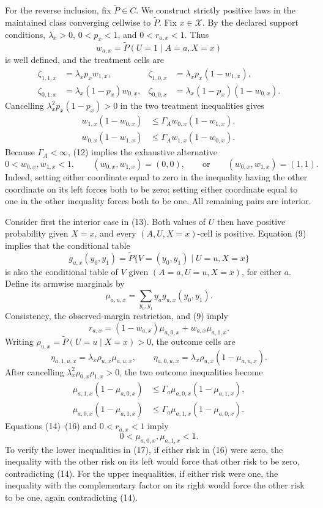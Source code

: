 For the reverse inclusion, fix \(\widetilde P\in C\).  We construct strictly positive laws in the maintained class converging cellwise to \(\widetilde P\).  Fix \(x\in\mathcal X\).  By the declared support conditions, \(\lambda_x>0\), \(0<p_x<1\), and \(0<r_{a,x}<1\).  Thus
\[
w_{a,x}=\widetilde P(U=1\mid A=a,X=x)
\]
is well defined, and the treatment cells are
\[
\begin{aligned}
\zeta_{1,1,x}&=\lambda_xp_xw_{1,x},
&\zeta_{1,0,x}&=\lambda_xp_x(1-w_{1,x}),\\
\zeta_{0,1,x}&=\lambda_x(1-p_x)w_{0,x},
&\zeta_{0,0,x}&=\lambda_x(1-p_x)(1-w_{0,x}).
\end{aligned}                                             \tag{11}
\]
Cancelling \(\lambda_x^2p_x(1-p_x)>0\) in the two treatment inequalities gives
\[
\begin{aligned}
w_{1,x}(1-w_{0,x})
&\leq\Gamma_Aw_{0,x}(1-w_{1,x}),\\
w_{0,x}(1-w_{1,x})
&\leq\Gamma_Aw_{1,x}(1-w_{0,x}).
\end{aligned}                                             \tag{12}
\]
Because \(\Gamma_A<\infty\), (12) implies the exhaustive alternative
\[
0<w_{0,x},w_{1,x}<1,
\qquad (w_{0,x},w_{1,x})=(0,0),
\qquad\text{or}\qquad(w_{0,x},w_{1,x})=(1,1).            \tag{13}
\]
Indeed, setting either coordinate equal to zero in the inequality having the other coordinate on its left forces both to be zero; setting either coordinate equal to one in the other inequality forces both to be one.  All remaining pairs are interior.

Consider first the interior case in (13).  Both values of \(U\) then have positive probability given \(X=x\), and every \((A,U,X=x)\)-cell is positive.  Equation (9) implies that the conditional table
\[
g_{u,x}(y_0,y_1)
=\widetilde P\{V=(y_0,y_1)\mid U=u,X=x\}
\]
is also the conditional table of \(V\) given \((A=a,U=u,X=x)\), for either \(a\).  Define its armwise marginals by
\[
\mu_{a,u,x}=\sum_{y_0,y_1}y_a g_{u,x}(y_0,y_1).
\]
Consistency, the observed-margin restriction, and (9) imply
\[
r_{a,x}=(1-w_{a,x})\mu_{a,0,x}+w_{a,x}\mu_{a,1,x}.       \tag{14}
\]
Writing \(\rho_{u,x}=\widetilde P(U=u\mid X=x)>0\), the outcome cells are
\[
\eta_{a,1,u,x}=\lambda_x\rho_{u,x}\mu_{a,u,x},
\qquad
\eta_{a,0,u,x}=\lambda_x\rho_{u,x}(1-\mu_{a,u,x}).      \tag{15}
\]
After cancelling \(\lambda_x^2\rho_{0,x}\rho_{1,x}>0\), the two outcome inequalities become
\[
\begin{aligned}
\mu_{a,1,x}(1-\mu_{a,0,x})
&\leq\Gamma_a\mu_{a,0,x}(1-\mu_{a,1,x}),\\
\mu_{a,0,x}(1-\mu_{a,1,x})
&\leq\Gamma_a\mu_{a,1,x}(1-\mu_{a,0,x}).
\end{aligned}                                             \tag{16}
\]
Equations (14)--(16) and \(0<r_{a,x}<1\) imply
\[
0<\mu_{a,0,x},\mu_{a,1,x}<1.                             \tag{17}
\]
To verify the lower inequalities in (17), if either risk in (16) were zero, the inequality with the other risk on its left would force that other risk to be zero, contradicting (14).  For the upper inequalities, if either risk were one, the inequality with the complementary factor on its right would force the other risk to be one, again contradicting (14).

